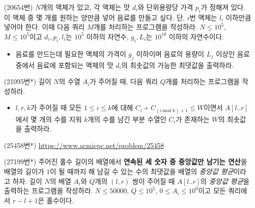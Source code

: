 \begin{problem}
    (20654번) $N$개의 액체가 있고, 각 액체는 맛 $d_i$와 단위용량당 가격 $p_i$가 정해져 있다. 이 액체 중 몇 개를 원하는 양만큼 넣어 음료를 만들고 싶다. 단, $i$번 액체는 $l_i$ 이하만큼 넣어야 한다. 이때 다음 쿼리 $M$개를 처리하는 프로그램을 작성하라. $N \leq 10^5$, $M \leq 10^5$이고 $d_i, p_i, l_i$는 $10^5$ 이하의 자연수, $g_i, L_i$는 $10^{18}$ 이하의 자연수이다.
    \begin{itemize}
        \item 음료를 만드는데 필요한 액체의 가격이 $g_j$ 이하이며 음료의 용량이 $L_j$ 이상인 음료 중에서 음료에 포함되는 액체의 맛 $d_i$의 최솟값의 가능한 최댓값을 출력하라.
    \end{itemize}
\end{problem}

\begin{problem}
    (21095번*) 길이 $N$의 수열 $A_i$가 주어질 때, 다음 쿼리 $Q$개를 처리하는 프로그램을 작성하라.
    \begin{itemize}
        \item $l, r, k$가 주어질 때 모든 $1 \leq i \leq k$에 대해 $C_i + C_{(i~\textrm{mod}~k)+1} \leq W$이면서 $A[l..r]$에서 몇 개의 수를 지워 $k$개의 수를 남긴 부분 수열인 $C_i$가 존재하는 $W$의 최솟값을 출력하라.
    \end{itemize}
\end{problem}

\begin{problem}
    (25458번*) \url{https://www.acmicpc.net/problem/25458}
\end{problem}

\begin{problem}
    (27199번*) 주어진 홀수 길이의 배열에서 \textbf{연속된 세 숫자 중 중앙값만 남기는 연산}을 배열의 길이가 $1$이 될 때까지 해 남길 수 있는 수의 최댓값을 배열의 \textit{중앙값 평균}이라고 하자. 길이 $N$의 배열 $A_i$와 $Q$개의 $(l, r)$ 쌍이 주어질 때 $A[l..r]$의 \textit{중앙값 평균}을 출력하는 프로그램을 작성하라. $N \leq 50000$, $Q \leq 10^5$, $0 \leq A_i \leq 10^9$이고 모든 쿼리에서 $r-l+1$은 홀수이다.
\end{problem}